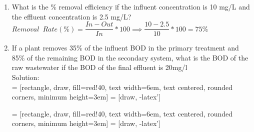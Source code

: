 \documentclass{article}
\begin{document}
\begin{enumerate}

\item What is the \% removal efficiency if the influent concentration is 10 mg/L and the effluent concentration is 2.5 mg/L?\\
$Removal \enspace Rate (\%) = \dfrac{In-Out}{In}*100 \implies \dfrac{10-2.5}{10}*100=\boxed{75\%}$

\item If a plant removes 35\% of the influent BOD in the primary treatment and 85\% of the remaining BOD in the secondary system, what is the BOD of the raw wastewater if the BOD of the final effluent is 20mg/l \\
Solution:\\
 = [rectangle, draw, fill=red!40, 
    text width=6em, text centered, rounded corners, minimum height=3em]
 = [draw, -latex']
\begin{figure}[!h]
\centering
{}
\end{figure}

 = [rectangle, draw, fill=red!40, 
    text width=6em, text centered, rounded corners, minimum height=3em]
 = [draw, -latex']
\begin{figure}[!h]
\centering
{}
\end{figure}
\end{enumerate}
\end{document}
